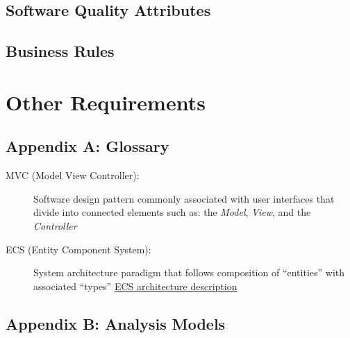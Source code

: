\documentclass[11pt]{article}
\begin{document}
\subsection{Software Quality Attributes}
\label{sec:org33341c9}
\subsection{Business Rules}
\label{sec:orgfef02e7}
\section{Other Requirements}
\label{sec:org6317d5d}
\subsection*{Appendix A: Glossary}
\label{sec:org38de81e}
\begin{description}
\item[{MVC (Model View Controller):}] Software design pattern commonly associated with user interfaces that divide into connected elements such as: the \emph{Model}, \emph{View}, and the \emph{Controller}
\item[{ECS (Entity Component System):}] System architecture paradigm that follows composition of “entities” with associated “types” \href{https://www.richardlord.net/blog/ecs/why-use-an-entity-framework.html}{ECS architecture description}
\end{description}
\subsection*{Appendix B: Analysis Models}
\label{sec:orga8f48cd}
\end{document}
